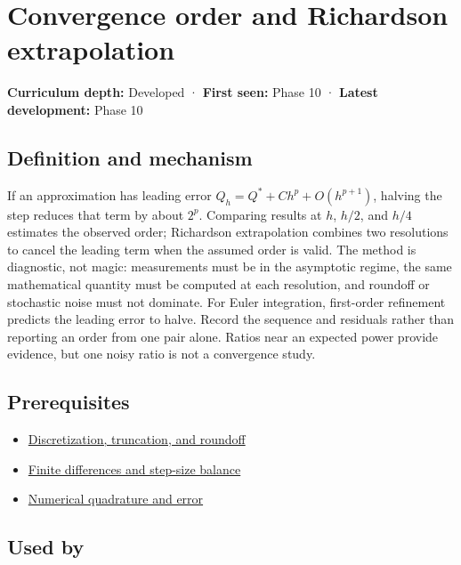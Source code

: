 \hypertarget{appendix-aca80b6bf17a}{}\label{referencestart:appendix-aca80b6bf17a}
\section{Convergence order and Richardson extrapolation}\label{appendix-aca80b6bf17a-convergence-order-and-richardson-extrapolation}

\textbf{Curriculum depth:} Developed · \textbf{First seen:} Phase 10 · \textbf{Latest development:} Phase 10

\subsection{Definition and mechanism}\label{appendix-aca80b6bf17a-definition-and-mechanism}

If an approximation has leading error \(Q_h=Q^*+Ch^p+O(h^{p+1})\), halving the step reduces that term by about \(2^p\). Comparing results at \(h\), \(h/2\), and \(h/4\) estimates the observed order; Richardson extrapolation combines two resolutions to cancel the leading term when the assumed order is valid. The method is diagnostic, not magic: measurements must be in the asymptotic regime, the same mathematical quantity must be computed at each resolution, and roundoff or stochastic noise must not dominate. For Euler integration, first-order refinement predicts the leading error to halve. Record the sequence and residuals rather than reporting an order from one pair alone. Ratios near an expected power provide evidence, but one noisy ratio is not a convergence study.

\subsection{Prerequisites}\label{appendix-aca80b6bf17a-prerequisites}

\begin{itemize}
\tightlist
\item
  \hyperref[appendix-6b0648b2b8e8]{Discretization, truncation, and roundoff}
\item
  \hyperref[appendix-e2d7b4f2161d]{Finite differences and step-size balance}
\item
  \hyperref[appendix-80521eae6b71]{Numerical quadrature and error}
\end{itemize}

\subsection{Used by}\label{appendix-aca80b6bf17a-used-by}

